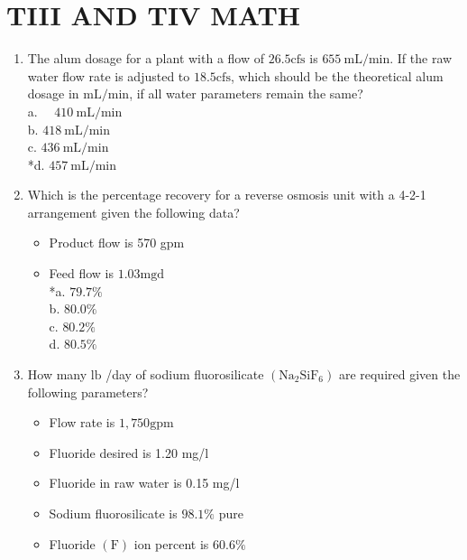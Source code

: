 \section{TIII AND TIV MATH}
\begin{enumerate}
\item The alum dosage for a plant with a flow of $26.5 \mathrm{cfs}$ is $655 \mathrm{~mL} / \mathrm{min}$. If the raw water flow rate is adjusted to $18.5 \mathrm{cfs}$, which should be the theoretical alum dosage in $\mathrm{mL} / \mathrm{min}$, if all water parameters remain the same?\\
a. $\quad 410 \mathrm{~mL} / \mathrm{min}$\\
b. $418 \mathrm{~mL} / \mathrm{min}$\\
c. $436 \mathrm{~mL} / \mathrm{min}$\\
*d. $457 \mathrm{~mL} / \mathrm{min}$\\
\item Which is the percentage recovery for a reverse osmosis unit with a 4-2-1 arrangement given the following data?\\
\begin{itemize}
\item Product flow is 570 gpm\\
\item Feed flow is $1.03 \mathrm{mgd}$\\
*a. $79.7 \%$\\
b. $80.0 \%$\\
c. $80.2 \%$\\
d. $80.5 \%$\\
\end{itemize}
\item How many $\mathrm{lb}$ /day of sodium fluorosilicate $\left(\mathrm{Na}_{2} \mathrm{SiF}_{6}\right)$ are required given the following parameters?\\
\begin{itemize}
\item Flow rate is $1,750 \mathrm{gpm}$\\
\item Fluoride desired is 1.20 mg/l\\
\item Fluoride in raw water is 0.15 mg/l\\
\item Sodium fluorosilicate is $98.1 \%$ pure\\
\item Fluoride $(\mathrm{F})$ ion percent is $60.6 \%$\\

\end{itemize}
\end{enumerate}
